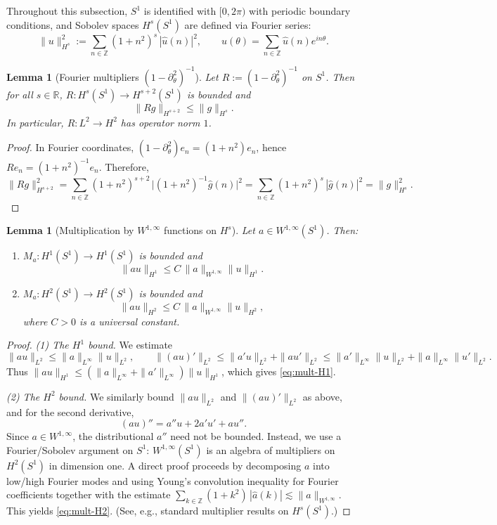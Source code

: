 \documentclass{amsart}
\numberwithin{equation}{section}
\newtheorem{lemma}[theorem]{Lemma}
\theoremstyle{definition}
\theoremstyle{remark}
\begin{document}
Throughout this subsection, $S^1$ is identified with $[0,2\pi)$ with periodic boundary conditions,
and Sobolev spaces $H^s(S^1)$ are defined via Fourier series:
\[
\|u\|_{H^s}^2 := \sum_{n\in\mathbb Z} (1+n^2)^s\,|\widehat u(n)|^2,
\qquad
u(\theta)=\sum_{n\in\mathbb Z}\widehat u(n)e^{in\theta}.
\]

\begin{lemma}[Fourier multipliers $(1-\partial_\theta^2)^{-1}$]\label{lem:fourier-multiplier}
Let $R:=(1-\partial_\theta^2)^{-1}$ on $S^1$. Then for all $s\in\mathbb R$,
$R:H^s(S^1)\to H^{s+2}(S^1)$ is bounded and
\[
\|Rg\|_{H^{s+2}}\le \|g\|_{H^s}.
\]
In particular, $R:L^2\to H^2$ has operator norm $1$.
\end{lemma}

\begin{proof}
In Fourier coordinates, $(1-\partial_\theta^2)e_n=(1+n^2)e_n$, hence
$Re_n=(1+n^2)^{-1}e_n$. Therefore,
\[
\|Rg\|_{H^{s+2}}^2
=
\sum_{n\in\mathbb Z} (1+n^2)^{s+2}\,\big|(1+n^2)^{-1}\widehat g(n)\big|^2
=
\sum_{n\in\mathbb Z} (1+n^2)^s\,|\widehat g(n)|^2
=\|g\|_{H^s}^2.
\]
\end{proof}

\begin{lemma}[Multiplication by $W^{1,\infty}$ functions on $H^s$]\label{lem:multiplication}
Let $a\in W^{1,\infty}(S^1)$. Then:
\begin{enumerate}
\item $M_a:H^1(S^1)\to H^1(S^1)$ is bounded and
\begin{equation}\label{eq:mult-H1}
\|a u\|_{H^1}\le C\,\|a\|_{W^{1,\infty}}\|u\|_{H^1}.
\end{equation}
\item $M_a:H^2(S^1)\to H^2(S^1)$ is bounded and
\begin{equation}\label{eq:mult-H2}
\|a u\|_{H^2}\le C\,\|a\|_{W^{1,\infty}}\|u\|_{H^2},
\end{equation}
where $C>0$ is a universal constant.
\end{enumerate}
\end{lemma}

\begin{proof}
\emph{(1) The $H^1$ bound.}
We estimate
\[
\|au\|_{L^2}\le \|a\|_{L^\infty}\|u\|_{L^2},
\qquad
\|(au)'\|_{L^2}\le \|a'u\|_{L^2}+\|au'\|_{L^2}
\le \|a'\|_{L^\infty}\|u\|_{L^2}+\|a\|_{L^\infty}\|u'\|_{L^2}.
\]
Thus $\|au\|_{H^1}\le (\|a\|_{L^\infty}+\|a'\|_{L^\infty})\|u\|_{H^1}$, which gives
\eqref{eq:mult-H1}.

\smallskip
\emph{(2) The $H^2$ bound.}
We similarly bound $\|au\|_{L^2}$ and $\|(au)'\|_{L^2}$ as above, and for the second derivative,
\[
(au)'' = a''u + 2a'u' + au''.
\]
Since $a\in W^{1,\infty}$, the distributional $a''$ need not be bounded.
Instead, we use a Fourier/Sobolev argument on $S^1$:
$W^{1,\infty}(S^1)$ is an algebra of multipliers on $H^2(S^1)$ in dimension one.
A direct proof proceeds by decomposing $a$ into low/high Fourier modes and using
Young's convolution inequality for Fourier coefficients together with the estimate
$\sum_{k\in\mathbb Z}(1+k^2)\,|\widehat a(k)|\lesssim \|a\|_{W^{1,\infty}}$.
This yields \eqref{eq:mult-H2}. (See, e.g., standard multiplier results on $H^s(S^1)$.)
\end{proof}
\end{document}
